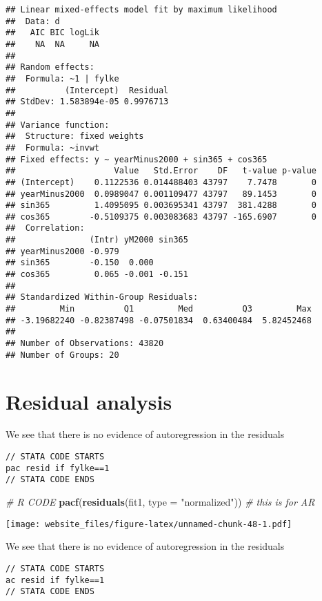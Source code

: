 \documentclass[]{book}
\newenvironment{Shaded}{\begin{snugshade}}{\end{snugshade}}
\newcommand{\KeywordTok}[1]{\textcolor[rgb]{0.13,0.29,0.53}{\textbf{#1}}}
\newcommand{\DataTypeTok}[1]{\textcolor[rgb]{0.13,0.29,0.53}{#1}}
\newcommand{\StringTok}[1]{\textcolor[rgb]{0.31,0.60,0.02}{#1}}
\newcommand{\CommentTok}[1]{\textcolor[rgb]{0.56,0.35,0.01}{\textit{#1}}}
\newcommand{\NormalTok}[1]{#1}
\begin{document}
\begin{verbatim}
## Linear mixed-effects model fit by maximum likelihood
##  Data: d 
##   AIC BIC logLik
##    NA  NA     NA
## 
## Random effects:
##  Formula: ~1 | fylke
##          (Intercept)  Residual
## StdDev: 1.583894e-05 0.9976713
## 
## Variance function:
##  Structure: fixed weights
##  Formula: ~invwt 
## Fixed effects: y ~ yearMinus2000 + sin365 + cos365 
##                    Value   Std.Error    DF   t-value p-value
## (Intercept)    0.1122536 0.014488403 43797    7.7478       0
## yearMinus2000  0.0989047 0.001109477 43797   89.1453       0
## sin365         1.4095095 0.003695341 43797  381.4288       0
## cos365        -0.5109375 0.003083683 43797 -165.6907       0
##  Correlation: 
##               (Intr) yM2000 sin365
## yearMinus2000 -0.979              
## sin365        -0.150  0.000       
## cos365         0.065 -0.001 -0.151
## 
## Standardized Within-Group Residuals:
##         Min          Q1         Med          Q3         Max 
## -3.19682240 -0.82387498 -0.07501834  0.63400484  5.82452468 
## 
## Number of Observations: 43820
## Number of Groups: 20
\end{verbatim}

\newpage

\section{Residual analysis}\label{residual-analysis-1}

We see that there is no evidence of autoregression in the residuals

\begin{verbatim}
// STATA CODE STARTS
pac resid if fylke==1
// STATA CODE ENDS
\end{verbatim}

\begin{Shaded}
\begin{Highlighting}[]
\CommentTok{# R CODE}
\KeywordTok{pacf}\NormalTok{(}\KeywordTok{residuals}\NormalTok{(fit1, }\DataTypeTok{type =} \StringTok{"normalized"}\NormalTok{)) }\CommentTok{# this is for AR}
\end{Highlighting}
\end{Shaded}

\texttt{[image: website\_files/figure-latex/unnamed-chunk-48-1.pdf]}

\newpage

We see that there is no evidence of autoregression in the residuals

\begin{verbatim}
// STATA CODE STARTS
ac resid if fylke==1
// STATA CODE ENDS
\end{verbatim}
\end{document}
